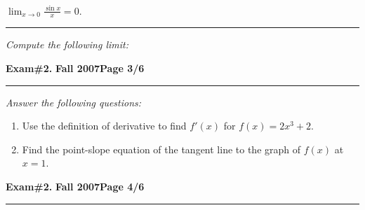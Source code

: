 \documentclass[12pt]{article}
\begin{document}
 $\displaystyle{\lim_{x\to 0} \frac{\sin x}{x}=0}.$
\vspace{14cm}
\hrule
{\problem[5 pts] \em Compute the following limit:}

\bigskip
{}
\newpage

\hfill{\large\bf Exam\#2.}\hfill{\large\bf
  Fall 2007}\hfill{\large\bf Page 3/6}\hrule

\bigskip
{\problem[10 pts] \em Answer the following questions:}
\begin{enumerate}
\item Use the definition of derivative to find $f'(x)$ for $f(x) = 2x^3+2$.
\vspace{10cm}
\begin{flushright}
\end{flushright}
\item Find the point-slope equation of the tangent line to the graph of $f(x)$ at $x=1$.
\end{enumerate}
\newpage

\hfill{\large\bf Exam\#2.}\hfill{\large\bf
  Fall 2007}\hfill{\large\bf Page 4/6}\hrule
\end{document}
